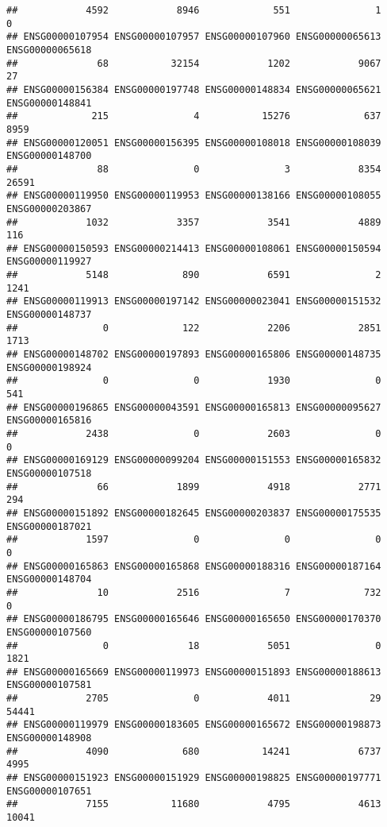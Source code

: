 \documentclass[
]{article}
\begin{document}
\begin{verbatim}
##            4592            8946             551               1               0 
## ENSG00000107954 ENSG00000107957 ENSG00000107960 ENSG00000065613 ENSG00000065618 
##              68           32154            1202            9067              27 
## ENSG00000156384 ENSG00000197748 ENSG00000148834 ENSG00000065621 ENSG00000148841 
##             215               4           15276             637            8959 
## ENSG00000120051 ENSG00000156395 ENSG00000108018 ENSG00000108039 ENSG00000148700 
##              88               0               3            8354           26591 
## ENSG00000119950 ENSG00000119953 ENSG00000138166 ENSG00000108055 ENSG00000203867 
##            1032            3357            3541            4889             116 
## ENSG00000150593 ENSG00000214413 ENSG00000108061 ENSG00000150594 ENSG00000119927 
##            5148             890            6591               2            1241 
## ENSG00000119913 ENSG00000197142 ENSG00000023041 ENSG00000151532 ENSG00000148737 
##               0             122            2206            2851            1713 
## ENSG00000148702 ENSG00000197893 ENSG00000165806 ENSG00000148735 ENSG00000198924 
##               0               0            1930               0             541 
## ENSG00000196865 ENSG00000043591 ENSG00000165813 ENSG00000095627 ENSG00000165816 
##            2438               0            2603               0               0 
## ENSG00000169129 ENSG00000099204 ENSG00000151553 ENSG00000165832 ENSG00000107518 
##              66            1899            4918            2771             294 
## ENSG00000151892 ENSG00000182645 ENSG00000203837 ENSG00000175535 ENSG00000187021 
##            1597               0               0               0               0 
## ENSG00000165863 ENSG00000165868 ENSG00000188316 ENSG00000187164 ENSG00000148704 
##              10            2516               7             732               0 
## ENSG00000186795 ENSG00000165646 ENSG00000165650 ENSG00000170370 ENSG00000107560 
##               0              18            5051               0            1821 
## ENSG00000165669 ENSG00000119973 ENSG00000151893 ENSG00000188613 ENSG00000107581 
##            2705               0            4011              29           54441 
## ENSG00000119979 ENSG00000183605 ENSG00000165672 ENSG00000198873 ENSG00000148908 
##            4090             680           14241            6737            4995 
## ENSG00000151923 ENSG00000151929 ENSG00000198825 ENSG00000197771 ENSG00000107651 
##            7155           11680            4795            4613           10041 

\end{verbatim}
\end{document}

